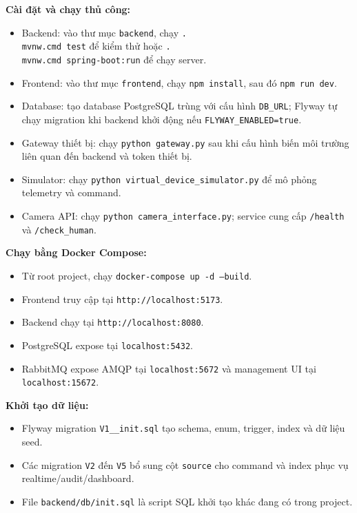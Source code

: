 \textbf{Cài đặt và chạy thủ công:}
\begin{itemize}
    \item Backend: vào thư mục \texttt{backend}, chạy \texttt{.\\mvnw.cmd test} để kiểm thử hoặc \texttt{.\\mvnw.cmd spring-boot:run} để chạy server.
    \item Frontend: vào thư mục \texttt{frontend}, chạy \texttt{npm install}, sau đó \texttt{npm run dev}.
    \item Database: tạo database PostgreSQL trùng với cấu hình \texttt{DB\_URL}; Flyway tự chạy migration khi backend khởi động nếu \texttt{FLYWAY\_ENABLED=true}.
    \item Gateway thiết bị: chạy \texttt{python gateway.py} sau khi cấu hình biến môi trường liên quan đến backend và token thiết bị.
    \item Simulator: chạy \texttt{python virtual\_device\_simulator.py} để mô phỏng telemetry và command.
    \item Camera API: chạy \texttt{python camera\_interface.py}; service cung cấp \texttt{/health} và \texttt{/check\_human}.
\end{itemize}

\textbf{Chạy bằng Docker Compose:}
\begin{itemize}
    \item Từ root project, chạy \texttt{docker-compose up -d --build}.
    \item Frontend truy cập tại \texttt{http://localhost:5173}.
    \item Backend chạy tại \texttt{http://localhost:8080}.
    \item PostgreSQL expose tại \texttt{localhost:5432}.
    \item RabbitMQ expose AMQP tại \texttt{localhost:5672} và management UI tại \texttt{localhost:15672}.
\end{itemize}

\textbf{Khởi tạo dữ liệu:}
\begin{itemize}
    \item Flyway migration \texttt{V1\_\_init.sql} tạo schema, enum, trigger, index và dữ liệu seed.
    \item Các migration \texttt{V2} đến \texttt{V5} bổ sung cột \texttt{source} cho command và index phục vụ realtime/audit/dashboard.
    \item File \texttt{backend/db/init.sql} là script SQL khởi tạo khác đang có trong project.
\end{itemize}


